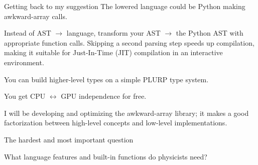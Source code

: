\documentclass[aspectratio=169]{beamer}
\begin{document}
\begin{frame}{Getting back to my suggestion}
\vspace{0.5 cm}
The lowered language could be Python making awkward-array calls.

\vspace{0.5 cm}
Instead of AST $\to$ language, transform your AST $\to$ the Python AST with appropriate function calls. Skipping a second parsing step speeds up compilation, making it suitable for Just-In-Time (JIT) compilation in an interactive environment.

\vspace{0.5 cm}
You can build higher-level types on a simple PLURP type system.

\vspace{0.5 cm}
You get CPU $\leftrightarrow$ GPU independence for free.

\vspace{0.5 cm}
I will be developing and optimizing the awkward-array library; it makes a good factorization between high-level concepts and low-level implementations.
\end{frame}

\begin{frame}{The hardest and most important question}
\huge
\vspace{0.5 cm}
\begin{center}
\begin{minipage}{0.8\linewidth}
\begin{center}
What language features and built-in functions do physicists need?
\end{center}
\end{minipage}
\end{center}
\end{frame}
\end{document}
